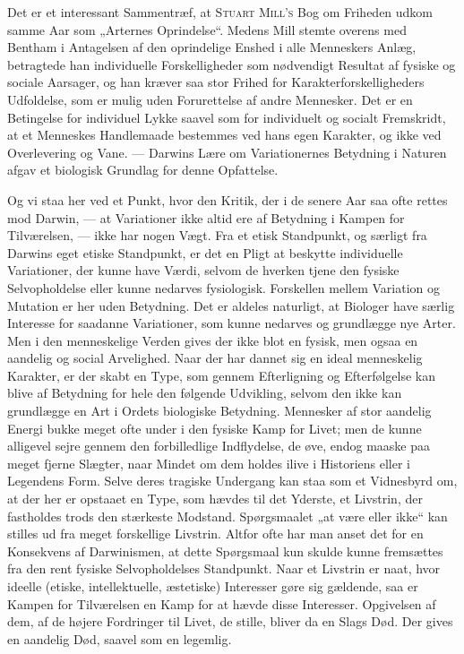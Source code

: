 \documentclass[12pt,a4paper,openany]{book}
\newcommand{\opage}[1]{\marginnote{\footnotesize\textit{[#1]}}}
\begin{document}
Det er et interessant Sammentræf, at \textsc{Stuart Mill’s} Bog
om Friheden udkom samme Aar som „Arternes Oprindelse“.
Medens Mill stemte overens med Bentham i Antagelsen af den
oprindelige Enshed i alle Menneskers Anlæg, betragtede han
individuelle Forskelligheder som nødvendigt Resultat af fysiske
og sociale Aarsager, og han kræver saa stor Frihed for Karakterforskelligheders
Udfoldelse, som er mulig uden Forurettelse
af andre Mennesker. Det er en Betingelse for individuel Lykke
saavel som for individuelt og socialt Fremskridt, at et Menneskes
Handlemaade bestemmes ved hans egen Karakter, og ikke
ved Overlevering og Vane. --- Darwins Lære om Variationernes
Betydning i Naturen afgav et biologisk Grundlag for denne
Opfattelse.

Og vi staa her ved et Punkt, hvor den Kritik, der i de
senere Aar saa ofte rettes mod Darwin, --- at Variationer ikke
altid ere af Betydning i Kampen for Tilværelsen, --- ikke har
nogen Vægt. Fra et etisk Standpunkt, og særligt fra Darwins
eget etiske Standpunkt, er det en Pligt at beskytte individuelle
Variationer, der kunne have Værdi, selvom de hverken tjene
den fysiske Selvopholdelse eller kunne nedarves fysiologisk.
Forskellen mellem Variation og Mutation er her uden Betydning.
Det er aldeles naturligt, at Biologer have særlig Interesse
for saadanne Variationer, som kunne nedarves og grundlægge
nye Arter. Men i den menneskelige Verden gives der
ikke blot en fysisk, men ogsaa en aandelig og social Arvelighed.
Naar der har dannet sig en ideal menneskelig Karakter,
er der skabt en Type, som gennem Efterligning og Efterfølgelse
kan blive af Betydning for hele den følgende Udvikling, selvom
den ikke kan grundlægge en Art i Ordets biologiske Betydning.
Mennesker af stor aandelig Energi bukke meget ofte
under i den fysiske Kamp for Livet; men de kunne alligevel
sejre gennem den forbilledlige Indflydelse, de øve, endog maaske
paa meget fjerne Slægter, naar Mindet om dem holdes ilive i
\setcounter{footnote}{0}%
\opage{225}Historiens eller i Legendens Form. Selve deres tragiske Undergang
kan staa som et Vidnesbyrd om, at der her er opstaaet
en Type, som hævdes til det Yderste, et Livstrin, der fastholdes
trods den stærkeste Modstand. Spørgsmaalet „at være eller
ikke“ kan stilles ud fra meget forskellige Livstrin. Altfor ofte
har man anset det for en Konsekvens af Darwinismen, at dette
Spørgsmaal kun skulde kunne fremsættes fra den rent fysiske
Selvopholdelses Standpunkt. Naar et Livstrin er naat, hvor
ideelle (etiske, intellektuelle, æstetiske) Interesser gøre sig gældende,
saa er Kampen for Tilværelsen en Kamp for at hævde
disse Interesser. Opgivelsen af dem, af de højere Fordringer
til Livet, de stille, bliver da en Slags Død. Der gives en
aandelig Død, saavel som en legemlig.
\end{document}
